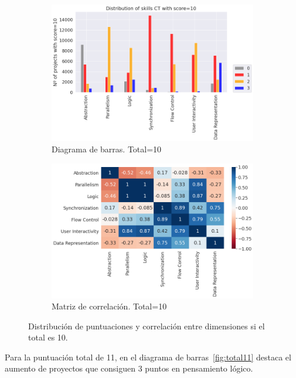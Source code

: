 \documentclass[a4paper, 12pt]{book}
\begin{document}
\begin{figure}[H]
    \centering
    \begin{subfigure}[h]{.49\textwidth} 
        \includegraphics[width=\textwidth]{img/distribucion_10_Scratch}
        \caption{Diagrama de barras. Total=10}
        \label{fig:total10}
    \end{subfigure}       
    \begin{subfigure}[h]{.49\textwidth} 
        \includegraphics[width=\textwidth]{img/corr_10_Scratch}
        \caption{Matriz de correlación. Total=10}
        \label{fig:corr10}
    \end{subfigure}
     \caption{Distribución de puntuaciones y correlación entre dimensiones si el total es 10.}
\end{figure}

Para la puntuación total de 11, en el diagrama de barras~\ref{fig:total11} destaca el aumento de proyectos que consiguen 3 puntos en pensamiento lógico.
\end{document}
